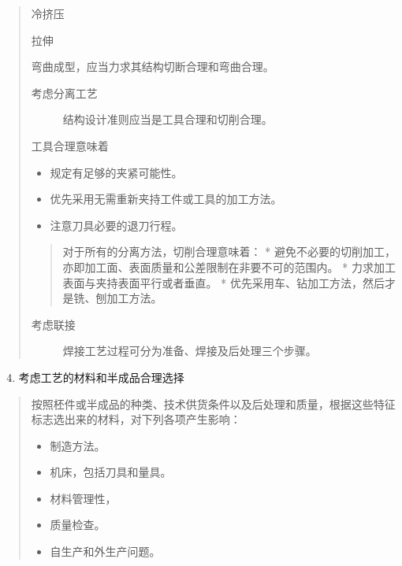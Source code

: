 \documentclass[letterpaper,10pt,english]{sphinxmanual}
\begin{document}
\begin{quote}
冷挤压

拉伸

弯曲成型，应当力求其结构切断合理和弯曲合理。
\begin{description}
\item[{考虑分离工艺}] \leavevmode
结构设计准则应当是工具合理和切削合理。

\end{description}

工具合理意味着
\begin{itemize}
\item {} 
规定有足够的夹紧可能性。

\item {} 
优先采用无需重新夹持工件或工具的加工方法。

\item {} 
注意刀具必要的退刀行程。

\end{itemize}
\begin{quote}

对于所有的分离方法，切削合理意味着：
* 避免不必要的切削加工，亦即加工面、表面质量和公差限制在非要不可的范围内。
* 力求加工表面与夹持表面平行或者垂直。
* 优先采用车、钻加工方法，然后才是铣、刨加工方法。
\end{quote}
\begin{description}
\item[{考虑联接}] \leavevmode
焊接工艺过程可分为准备、焊接及后处理三个步骤。

\end{description}
\end{quote}
\begin{enumerate}
\setcounter{enumi}{3}
\item {} 
考虑工艺的材料和半成品合理选择

\end{enumerate}
\begin{quote}

按照柸件或半成品的种类、技术供货条件以及后处理和质量，根据这些特征标志选出来的材料，对下列各项产生影响：
\begin{itemize}
\item {} 
制造方法。

\item {} 
机床，包括刀具和量具。

\item {} 
材料管理性，

\item {} 
质量检查。

\item {} 
自生产和外生产问题。

\end{itemize}
\end{quote}
\end{document}

